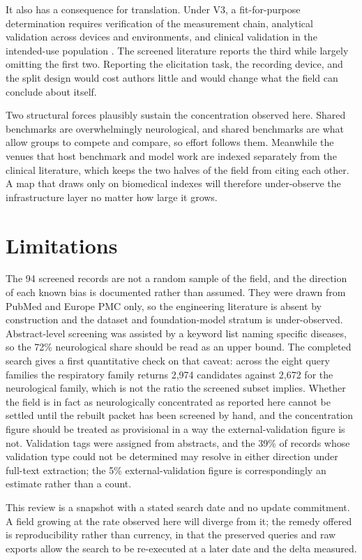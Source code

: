 \documentclass[11pt]{article}
\begin{document}
It also has a consequence for translation. Under V3, a fit-for-purpose
determination requires verification of the measurement chain, analytical
validation across devices and environments, and clinical validation in the
intended-use population \citep{goldsack2020v3}. The screened literature reports
the third while largely omitting the first two. Reporting the elicitation task,
the recording device, and the split design would cost authors little and would
change what the field can conclude about itself.

Two structural forces plausibly sustain the concentration observed here. Shared
benchmarks are overwhelmingly neurological, and shared benchmarks are what allow
groups to compete and compare, so effort follows them. Meanwhile the venues that
host benchmark and model work are indexed separately from the clinical
literature, which keeps the two halves of the field from citing each other. A
map that draws only on biomedical indexes will therefore under-observe the
infrastructure layer no matter how large it grows.

\section{Limitations}

The 94 screened records are not a random sample of the field, and the direction
of each known bias is documented rather than assumed. They were drawn from
PubMed and Europe PMC only, so the engineering literature is absent by
construction and the dataset and foundation-model stratum is under-observed.
Abstract-level screening was assisted by a keyword list naming specific
diseases, so the 72\% neurological share should be read as an upper bound.
The completed search gives a first quantitative check on that caveat: across
the eight query families the respiratory family returns 2,974 candidates
against 2,672 for the neurological family, which is not the ratio the screened
subset implies. Whether the field is in fact as neurologically concentrated as
reported here cannot be settled until the rebuilt packet has been screened by
hand, and the concentration figure should be treated as provisional in a way
the external-validation figure is not.
Validation tags were assigned from abstracts, and the 39\% of records whose
validation type could not be determined may resolve in either direction under
full-text extraction; the 5\% external-validation figure is correspondingly an
estimate rather than a count.

This review is a snapshot with a stated search date and no update commitment. A field growing at the rate observed here will diverge from it; the remedy offered is reproducibility rather than currency, in that the preserved queries and raw exports allow the search to be re-executed at a later date and the delta measured.
\end{document}
